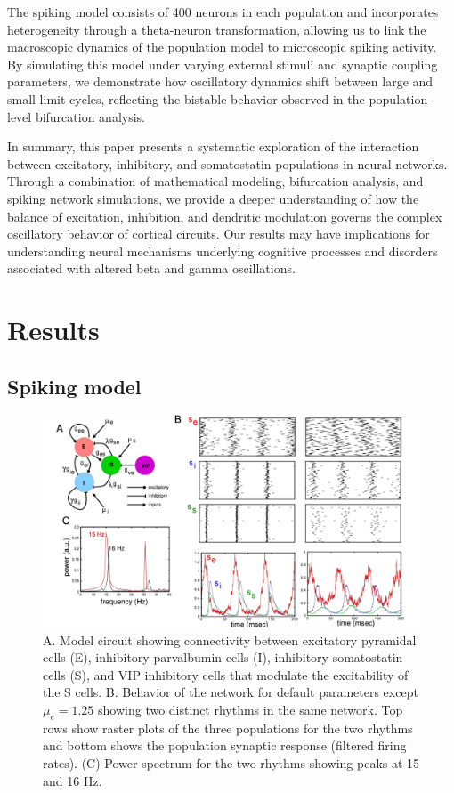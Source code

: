 \documentclass[10pt,letterpaper]{article}
\begin{document}
The spiking model consists of 400 neurons in each population and incorporates heterogeneity through a theta-neuron transformation, allowing us to link the macroscopic dynamics of the population model to microscopic spiking activity. By simulating this model under varying external stimuli and synaptic coupling parameters, we demonstrate how oscillatory dynamics shift between large and small limit cycles, reflecting the bistable behavior observed in the population-level bifurcation analysis.

In summary, this paper presents a systematic exploration of the interaction between excitatory, inhibitory, and somatostatin populations in neural networks. Through a combination of mathematical modeling, bifurcation analysis, and spiking network simulations, we provide a deeper understanding of how the balance of excitation, inhibition, and dendritic modulation governs the complex oscillatory behavior of cortical circuits. Our results may have implications for understanding neural mechanisms underlying cognitive processes and disorders associated with altered beta and gamma oscillations.



\section*{Results}

\subsection*{Spiking model}

\begin{figure}
  \includegraphics[width=.9\textwidth]{afig1.pdf}
  \caption{A. Model circuit showing connectivity between excitatory pyramidal cells (E), inhibitory parvalbumin cells (I), inhibitory somatostatin cells (S), and VIP inhibitory cells that modulate the excitability of the S cells. B. Behavior of the network for default parameters except $\mu_e=1.25$ showing two distinct rhythms in the same network. Top rows show raster plots of the three populations for the two rhythms and bottom shows the population synaptic response (filtered firing rates). (C) Power spectrum for the two rhythms showing peaks at 15 and 16 Hz.}
  \label{fig:1}
\end{figure}
\end{document}
